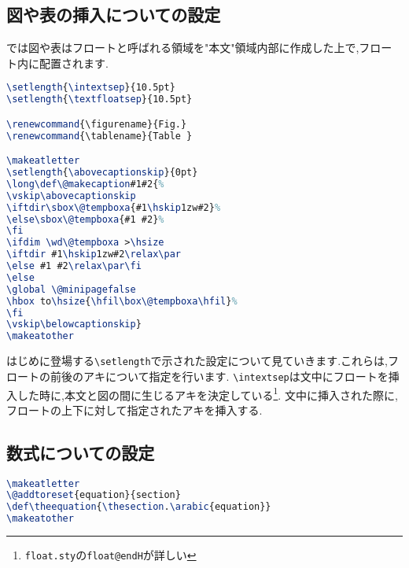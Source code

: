 \subsection{図や表の挿入についての設定}

{\pLaTeX}では図や表はフロートと呼ばれる領域を"本文"領域内部に作成した上で,フロート内に配置されます.
\begin{lstlisting}[caption = フロートまわりの設定, label = list:float, language = tex]
\setlength{\intextsep}{10.5pt}
\setlength{\textfloatsep}{10.5pt}

\renewcommand{\figurename}{Fig.}
\renewcommand{\tablename}{Table }

\makeatletter
\setlength{\abovecaptionskip}{0pt}
\long\def\@makecaption#1#2{%
\vskip\abovecaptionskip
\iftdir\sbox\@tempboxa{#1\hskip1zw#2}%
\else\sbox\@tempboxa{#1 #2}%
\fi
\ifdim \wd\@tempboxa >\hsize
\iftdir #1\hskip1zw#2\relax\par
\else #1 #2\relax\par\fi
\else
\global \@minipagefalse
\hbox to\hsize{\hfil\box\@tempboxa\hfil}%
\fi
\vskip\belowcaptionskip}
\makeatother
\end{lstlisting}
はじめに登場する\verb|\setlength|で示された設定について見ていきます.これらは,フロートの前後のアキについて指定を行います.
\verb|\intextsep|は文中にフロートを挿入した時に,本文と図の間に生じるアキを決定している\footnote{\texttt{float.sty}の\texttt{float@endH}が詳しい}.
文中に挿入された際に,フロートの上下に対して指定されたアキを挿入する.

\subsection{数式についての設定}
\begin{lstlisting}[caption = 数式まわりの設定, label = list:eq, language = tex]
\makeatletter
\@addtoreset{equation}{section}
\def\theequation{\thesection.\arabic{equation}}
\makeatother
\end{lstlisting}
